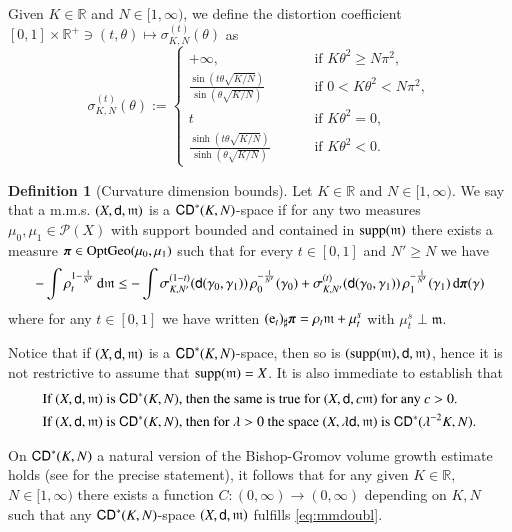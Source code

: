\documentclass[11pt,reqno]{amsart}
\newcommand{\supp}{\mathop{\rm supp}\nolimits}
\newcommand{\mm}{\mathfrak m}
\newcommand{\sfd}{{\sf d}}
\renewcommand{\d}{{\rm{d}}}
\newcommand{\R}{\mathbb{R}}
\newcommand{\Prob}{\mathscr P}
\newcommand{\e}{{\rm{e}}}                           %
\newcommand{\gopt}{{\rm{OptGeo}}}                   %
\newcommand{\ppi}{{\mbox{\boldmath$\pi$}}}
\newcommand{\CD}{{\sf CD}}
\theoremstyle{definition}
\newtheorem{definition}[theorem]{Definition}
\theoremstyle{remark}
\theoremstyle{remark}
\theoremstyle{remark}
\theoremstyle{remark}
\theoremstyle{remark}
\theoremstyle{remark}
\theoremstyle{remark}
\begin{document}
Given $K \in \R$ and $N \in [1, \infty)$, we define the distortion coefficient $[0,1]\times\R^+\ni (t,\theta)\mapsto \sigma^{(t)}_{K,N}(\theta)$ as
\[
\sigma^{(t)}_{K,N}(\theta):=\left\{
\begin{array}{ll}
+\infty,&\qquad\textrm{ if }K\theta^2\geq N\pi^2,\\
\frac{\sin(t\theta\sqrt{K/N})}{\sin(\theta\sqrt{K/N})}&\qquad\textrm{ if }0<K\theta^2 <N\pi^2,\\
t&\qquad\textrm{ if }K\theta^2=0,\\
\frac{\sinh(t\theta\sqrt{K/N})}{\sinh(\theta\sqrt{K/N})}&\qquad\textrm{ if }K\theta^2 <0.
\end{array}
\right.
\]
\begin{definition}[Curvature dimension bounds]\label{d:CD*}
Let $K \in \R$ and $ N\in[1,  \infty)$. We say that a m.m.s.  $(X,\sfd,\mm)$
 is a $\CD^*(K,N)$-space if for any two measures $\mu_0, \mu_1 \in \Prob(X)$ with support  bounded and contained in $\supp(\mm)$ there
exists a measure $\ppi \in \gopt(\mu_0,\mu_1)$ such that for every $t \in [0,1]$
and $N' \geq  N$ we have
\begin{equation}\label{eq:CD-def}
-\int\rho_t^{1-\frac1{N'}}\,\d\mm\leq - \int \sigma^{(1-t)}_{K,N'}(\sfd(\gamma_0,\gamma_1))\, \rho_0^{-\frac1{N'}}(\gamma_{0})+\sigma^{(t)}_{K,N'}(\sfd(\gamma_0,\gamma_1))\, \rho_1^{-\frac1{N'}}(\gamma_{1}) \,\d\ppi(\gamma)
\end{equation}
where for any $t\in[0,1]$ we  have written $(\e_t)_\sharp\ppi=\rho_t\mm+\mu_t^s$  with $\mu_t^s \perp \mm$.
\end{definition}
Notice that if $(X,\sfd,\mm)$ is a $\CD^*(K,N)$-space, then so is $(\supp(\mm),\sfd,\mm)$, hence it is not restrictive to assume that $\supp(\mm)=X$. It is also immediate to establish that
\begin{equation}
\label{eq:cdinv}
\begin{split}
&\text{If }(X,\sfd,\mm)\text{ is $\CD^*(K,N)$, then the same is true for $(X,\sfd,c\mm)$ for any }c>0.\\
&\text{If }(X,\sfd,\mm)\text{ is $\CD^*(K,N)$, then for $\lambda>0$ the space $(X,\lambda \sfd,\mm)$ is $\CD^*(\lambda^{-2}K,N)$}.
\end{split}
\end{equation}

On $\CD^*(K,N)$ a natural version of the Bishop-Gromov volume growth estimate holds (see \cite{BS2010} for the precise statement), it follows that  for any given $K\in\R$, $N\in[1,\infty)$ there exists a function $C:(0,\infty)\to(0,\infty)$ depending on $K,N$ such that any $\CD^*(K,N)$-space $(X,\sfd,\mm)$ fulfills \eqref{eq:mmdoubl}. 
\end{document}
